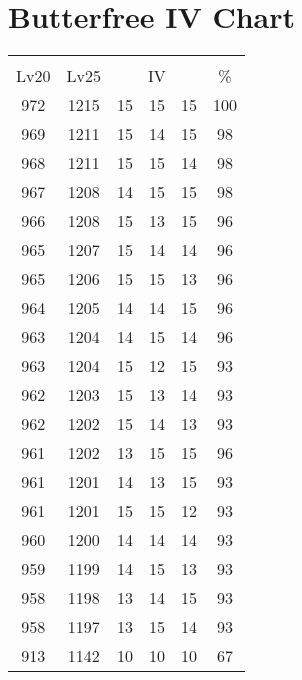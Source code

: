 \documentclass{article}%
\begin{document}
%
\normalsize%
\section{Butterfree IV Chart}%
\label{sec:Butterfree IV Chart}%
\renewcommand{\arraystretch}{1.5}%
\begin{tabular}{|c|c|c|c|c|c|}%
\hline%
\multicolumn{6}{|c|}{\textcolor{white}{ 
\linebreak{Butterfree}
}%
\cellcolor{black}}\\%
\multicolumn{1}{|c}{Lv20}&\multicolumn{1}{c|}{Lv25}&\multicolumn{3}{c|}{IV}&\multicolumn{1}{|c|}{\%}\\%
\hline%
\rowcolor{color100}%
972&1215&15&15&15&100\\%
\hline%
\rowcolor{color98}%
969&1211&15&14&15&98\\%
\hline%
\rowcolor{color98}%
968&1211&15&15&14&98\\%
\hline%
\rowcolor{color98}%
967&1208&14&15&15&98\\%
\hline%
\rowcolor{color96}%
966&1208&15&13&15&96\\%
\hline%
\rowcolor{color96}%
965&1207&15&14&14&96\\%
\hline%
\rowcolor{color96}%
965&1206&15&15&13&96\\%
\hline%
\rowcolor{color96}%
964&1205&14&14&15&96\\%
\hline%
\rowcolor{color96}%
963&1204&14&15&14&96\\%
\hline%
\rowcolor{color93}%
963&1204&15&12&15&93\\%
\hline%
\rowcolor{color93}%
962&1203&15&13&14&93\\%
\hline%
\rowcolor{color93}%
962&1202&15&14&13&93\\%
\hline%
\rowcolor{color96}%
961&1202&13&15&15&96\\%
\hline%
\rowcolor{color93}%
961&1201&14&13&15&93\\%
\hline%
\rowcolor{color93}%
961&1201&15&15&12&93\\%
\hline%
\rowcolor{color93}%
960&1200&14&14&14&93\\%
\hline%
\rowcolor{color93}%
959&1199&14&15&13&93\\%
\hline%
\rowcolor{color93}%
958&1198&13&14&15&93\\%
\hline%
\rowcolor{color93}%
958&1197&13&15&14&93\\%
\hline%
\rowcolor{color91}%
913&1142&10&10&10&67\\%
\end{tabular}

%
\end{document}
